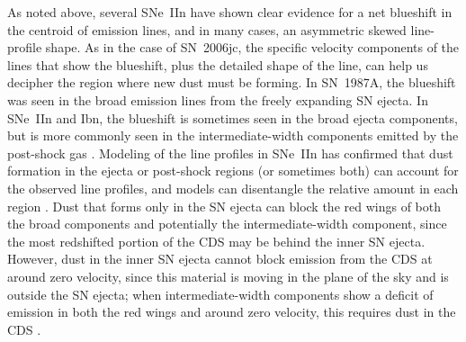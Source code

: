 \documentclass[fleqn,usenatbib,useAMS]{mnras}
\begin{document}
As noted above, several SNe~IIn have shown clear evidence for a net
blueshift in the centroid of emission lines, and in many cases, an
asymmetric skewed line-profile shape.  As in the case of SN~2006jc,
the specific velocity components of the lines that show the blueshift,
plus the detailed shape of the line, can help us decipher the region
where new dust must be forming.  In SN~1987A, the blueshift was seen
in the broad emission lines from the freely expanding SN ejecta.  In
SNe~IIn and Ibn, the blueshift is sometimes seen in the broad ejecta
components, but is more commonly seen in the intermediate-width components
emitted by the post-shock gas
\citep{smith09sn05ip,smith12,gall14,smith20}.  Modeling of the line
profiles in SNe~IIn has confirmed that dust formation in the ejecta or
post-shock regions (or sometimes both) can account for the observed
line profiles, and models can disentangle the relative amount in each
region \citep{chugai18,bevan19,bevan20}.  Dust that forms only in the SN ejecta
can block the red wings of both the broad components and potentially
the intermediate-width component, since the most redshifted portion of
the CDS  may be behind the inner SN ejecta.
However, dust in the inner SN ejecta cannot block emission from
the CDS at around zero velocity, since this material is moving in the
plane of the sky and is outside the SN ejecta; when intermediate-width
components show a deficit of emission in both the red wings and around
zero velocity, this requires dust in the CDS
\citep{smith08jc,smith12,chugai18}.
\end{document}
